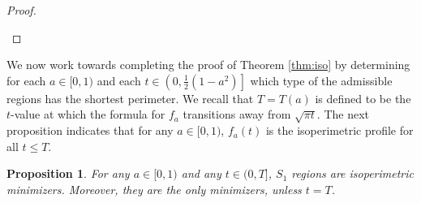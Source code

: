 \documentclass[leqno]{article}
\numberwithin{equation}{section}
\theoremstyle{definition}
\theoremstyle{remark}
\theoremstyle{plain}
\newtheorem{proposition}[equation]{Proposition}
\begin{document}
\begin{proof}
\begin{center}
\label{fig:reflection}
\end{center}



\end{proof}


We now work towards completing the proof of Theorem \ref{thm:iso} by determining for each $a\in [0,1)$ and each $t\in \left(0,\frac{1}{2}(1-a^2)\right]$ which type of the admissible regions has the shortest perimeter.  We recall that $T = T(a)$ is defined to be the $t$-value at which the formula for $f_a$ transitions away from $\sqrt{\pi t}$.  The next proposition indicates that for any $a\in [0,1)$, $f_a(t)$ is the isoperimetric profile for all $t\leq T$.

\begin{proposition}\label{prop:fsmallt} For any $a\in [0,1)$ and any $t\in (0,T]$, $S_1$ regions are isoperimetric minimizers.  Moreover, they are the only minimizers, unless $t = T$.
\end{proposition}
\end{document}
